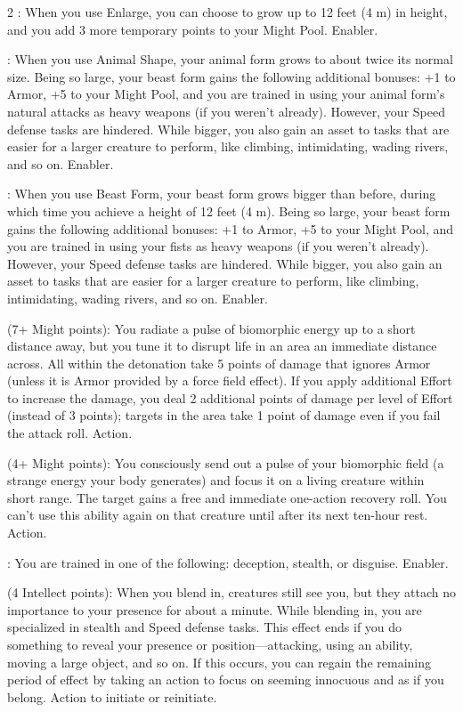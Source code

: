 \begin{multicols}{2}
: When you use Enlarge, you can choose to grow up to 12 feet (4 m) in height, and you add 3 more temporary points to your Might Pool. Enabler. 

: When you use Animal Shape, your animal form grows to about twice its normal size. Being so large, your beast form gains the following additional bonuses: +1 to Armor, +5 to your Might Pool, and you are trained in using your animal form’s natural attacks as heavy weapons (if you weren’t already). However, your Speed defense tasks are hindered. While bigger, you also gain an asset to tasks that are easier for a larger creature to perform, like climbing, intimidating, wading rivers, and so on. Enabler. 

: When you use Beast Form, your beast form grows bigger than before, during which time you achieve a height of 12 feet (4 m).
Being so large, your beast form gains the following additional bonuses: +1 to Armor, +5 to your Might Pool, and you are trained in using your fists as heavy weapons (if you weren’t already). However, your Speed defense tasks are hindered. While bigger, you also gain an asset to tasks that are easier for a larger creature to perform, like climbing, intimidating, wading rivers, and so on. Enabler.

 (7+ Might points): You radiate a pulse of biomorphic energy up to a short distance away, but you tune it to disrupt life in an area an immediate distance across. All within the detonation take 5 points of damage that ignores Armor (unless it is Armor provided by a force field effect). If you apply additional Effort to increase the damage, you deal 2 additional points of damage per level of Effort (instead of 3 points); targets in the area take 1 point of damage even if you fail the attack roll. Action. 

 (4+ Might points): You consciously send out a pulse of your biomorphic field (a strange energy your body generates) and focus it on a living creature within short range. The target gains a free and immediate one-action recovery roll. You can’t use this ability again on that creature until after its next ten-hour rest. Action. 

: You are trained in one of the following: deception, stealth, or disguise. Enabler. 


 (4 Intellect points): When you blend in, creatures still see you, but they attach no importance to your presence for about a minute. While blending in, you are specialized in stealth and Speed defense tasks. This effect ends if you do something to reveal your presence or position—attacking, using an ability, moving a large object, and so on. If this occurs, you can regain the remaining period of effect by taking an action to focus on seeming innocuous and as if you belong. Action to initiate or reinitiate. 


\end{multicols}
